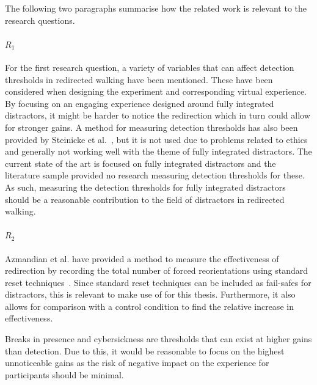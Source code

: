 The following two paragraphs summarise how the related work is relevant to the research questions.

\paragraph{$R_1$}
For the first research question, a variety of variables that can affect detection thresholds in redirected walking have been mentioned. These have been considered when designing the experiment and corresponding virtual experience. By focusing on an engaging experience designed around fully integrated distractors, it might be harder to notice the redirection which in turn could allow for stronger gains. A method for measuring detection thresholds has also been provided by Steinicke et al.~\cite{5072212}, but it is not used due to problems related to ethics and generally not working well with the theme of fully integrated distractors. The current state of the art is focused on fully integrated distractors and the literature sample provided no research measuring detection thresholds for these. As such, measuring the detection thresholds for fully integrated distractors should be a reasonable contribution to the field of distractors in redirected walking.

\paragraph{$R_2$}
Azmandian et al. have provided a method to measure the effectiveness of redirection by recording the total number of forced reorientations using standard reset techniques~\cite{azmandian2015physical}. Since standard reset techniques can be included as fail-safes for distractors, this is relevant to make use of for this thesis. Furthermore, it also allows for comparison with a control condition to find the relative increase in effectiveness.

Breaks in presence and cybersickness are thresholds that can exist at higher gains than detection. Due to this, it would be reasonable to focus on the highest unnoticeable gains as the risk of negative impact on the experience for participants should be minimal. 

